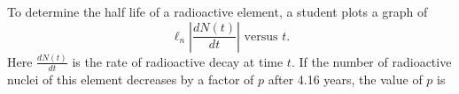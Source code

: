 
\item To determine the half life of a radioactive element, a student plots a graph of 
    \[
    \ell_n \left|\frac{dN(t)}{dt}\right| \text{ versus } t.
    \]
    Here $\frac{dN(t)}{dt}$ is the rate of radioactive decay at time $t$. If the number of radioactive nuclei of this element decreases by a factor of $p$ after 4.16 years, the value of $p$ is
    \begin{center}
    \end{center}
